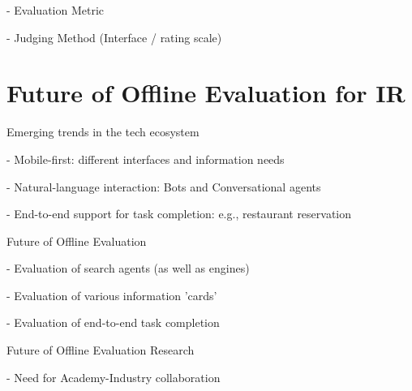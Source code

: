 \documentclass[openany]{now} %
\newcommand{\newpar}{\bigskip\noindent}
\begin{document}
-	Evaluation Metric

-	Judging Method (Interface / rating scale) 


\section{Future of Offline Evaluation for IR}

Emerging trends in the tech ecosystem

- Mobile-first: different interfaces and information needs

- Natural-language interaction: Bots and Conversational agents

- End-to-end support for task completion: e.g., restaurant reservation 

\newpar
Future of Offline Evaluation

- Evaluation of search agents (as well as engines)

- Evaluation of various information 'cards'

- Evaluation of end-to-end task completion

\newpar
Future of Offline Evaluation Research

- Need for Academy-Industry collaboration

\backmatter  %



	
\end{document}
